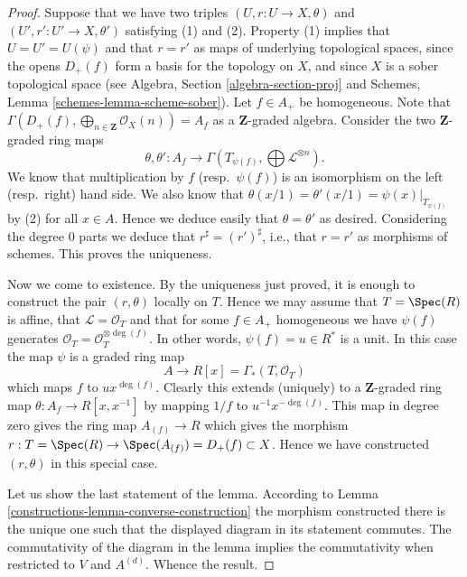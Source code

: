 \begin{proof}

Suppose that we have two triples $(U, r : U \to X, \theta)$
and $(U', r' : U' \to X, \theta')$ satisfying (1) and (2).
Property (1) implies that $U = U' = U(\psi)$ and that
$r = r'$ as maps of underlying topological
spaces, since the opens $D_{+}(f)$ form a basis for the topology
on $X$, and since $X$ is a sober topological space (see
Algebra, Section \ref{algebra-section-proj}
and
Schemes, Lemma \ref{schemes-lemma-scheme-sober}).
Let $f \in A_{+}$ be homogeneous. Note that
$\Gamma(D_{+}(f), \bigoplus_{n \in \mathbf{Z}} \mathcal{O}_X(n)) = A_f$
as a $\mathbf{Z}$-graded algebra. Consider the two
$\mathbf{Z}$-graded ring maps
$$
\theta, \theta' :
A_f
\longrightarrow
\Gamma(T_{\psi(f)}, \bigoplus \mathcal{L}^{\otimes n}).
$$
We know that multiplication by $f$ (resp.\ $\psi(f)$)
is an isomorphism on the left (resp.\ right) hand side.
We also know that $\theta(x/1) = \theta'(x/1) = \psi(x)|_{T_{\psi(f)}}$
by (2) for all $x \in A$. Hence we deduce easily that $\theta = \theta'$
as desired. Considering the degree $0$ parts we deduce that
$r^\sharp = (r')^\sharp$, i.e., that $r = r'$ as morphisms of schemes.
This proves the uniqueness.

\medskip\noindent
Now we come to existence. By the uniqueness just proved, it is enough to
construct the pair $(r, \theta)$ locally on $T$. Hence we may assume
that $T = \Spec(R)$ is affine, that $\mathcal{L} = \mathcal{O}_T$
and that for some $f \in A_{+}$ homogeneous we have
$\psi(f)$ generates $\mathcal{O}_T = \mathcal{O}_T^{\otimes \deg(f)}$.
In other words, $\psi(f) = u \in R^*$ is a unit. In this case the map
$\psi$ is a graded ring map
$$
A \longrightarrow R[x] = \Gamma_*(T, \mathcal{O}_T)
$$
which maps $f$ to $ux^{\deg(f)}$. Clearly this extends (uniquely) to
a $\mathbf{Z}$-graded ring map $\theta : A_f \to R[x, x^{-1}]$ by
mapping $1/f$ to $u^{-1}x^{-\deg(f)}$. This map in degree zero gives
the ring map $A_{(f)} \to R$ which gives the morphism
$r : T = \Spec(R) \to \Spec(A_{(f)}) = D_{+}(f) \subset X$.
Hence we have constructed $(r, \theta)$ in this special case.

\medskip\noindent
Let us show the last statement of the lemma.
According to Lemma \ref{constructions-lemma-converse-construction}
the morphism constructed there is the unique one such that
the displayed diagram in its statement commutes.
The commutativity of the diagram in the lemma implies the
commutativity when restricted to $V$ and $A^{(d)}$.
Whence the result.
\end{proof}

